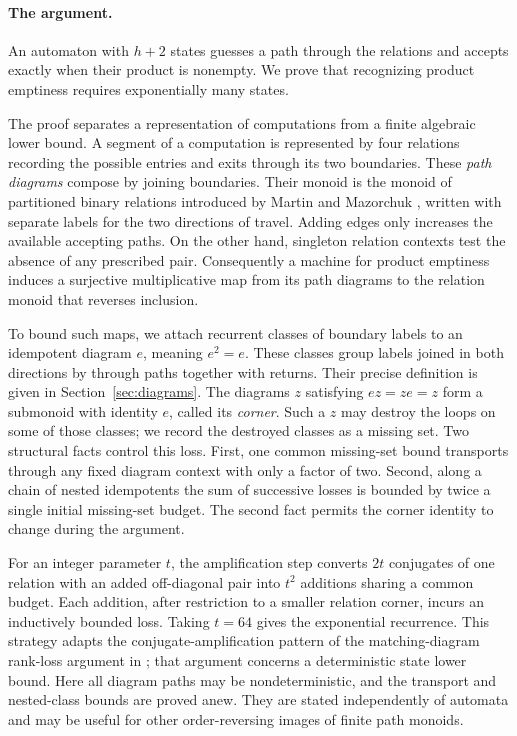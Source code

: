 \paragraph{The argument.}
An automaton with $h+2$ states guesses a path through the
relations and accepts exactly when their product is nonempty.
We prove that recognizing product emptiness requires exponentially many
states.

The proof separates a representation of computations from a finite
algebraic lower bound. A segment of a computation is represented by four
relations recording the possible entries and exits through its two
boundaries. These \emph{path diagrams} compose by joining boundaries.
Their monoid is the monoid of partitioned binary relations introduced
by Martin and Mazorchuk \cite[Sections~2.1--2.3]{MartinMazorchuk2013},
written with separate labels for the two directions of travel.
Adding edges only increases the available accepting paths. On the other
hand, singleton relation contexts test the absence of any prescribed
pair. Consequently a machine for product emptiness induces a
surjective multiplicative map from its path diagrams to the relation
monoid that reverses inclusion.

To bound such maps, we attach recurrent classes of boundary labels to an
idempotent diagram $e$, meaning $e^2=e$. These classes group labels joined
in both directions by through paths together with returns. Their precise
definition is given in Section~\ref{sec:diagrams}.
The diagrams $z$ satisfying $ez=ze=z$ form a
submonoid with identity $e$, called its \emph{corner}. Such a $z$ may
destroy the loops on some of those classes; we record the destroyed
classes as a missing set. Two structural facts
control this loss. First, one common missing-set bound transports through
any fixed diagram context with only a factor of two. Second, along a
chain of nested idempotents the sum of successive losses is bounded by
twice a single initial missing-set budget. The second fact permits the
corner identity to change during the argument.

For an integer parameter $t$, the amplification step converts $2t$
conjugates of one relation with an added off-diagonal pair
into $t^2$ additions sharing a common budget. Each addition, after
restriction to a smaller relation corner, incurs an inductively bounded
loss. Taking $t=64$ gives the exponential recurrence. This strategy
adapts the conjugate-amplification pattern of the matching-diagram
rank-loss argument in
\cite[Section~3]{CompanionDeterminization2026}; that argument concerns a deterministic
state lower bound. Here all diagram paths may be nondeterministic, and
the transport and nested-class bounds are proved anew. They are stated
independently of automata and may be useful for other order-reversing
images of finite path monoids.

